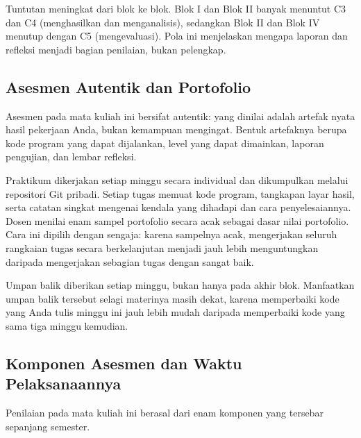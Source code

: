 Tuntutan meningkat dari blok ke blok. Blok I dan Blok II
banyak menuntut C3 dan C4 (menghasilkan dan menganalisis), sedangkan Blok II
dan Blok IV menutup dengan C5 (mengevaluasi). Pola ini menjelaskan mengapa
laporan  dan refleksi menjadi bagian penilaian, bukan
pelengkap.

\subsection{Asesmen Autentik dan Portofolio}

Asesmen pada mata kuliah ini bersifat autentik: yang dinilai adalah artefak
nyata hasil pekerjaan Anda, bukan kemampuan mengingat. Bentuk artefaknya
berupa kode program yang dapat dijalankan, level yang dapat dimainkan,
laporan pengujian, dan lembar refleksi.

Praktikum dikerjakan setiap minggu secara individual dan dikumpulkan melalui
repositori Git pribadi. Setiap tugas memuat kode program, tangkapan layar
hasil, serta catatan singkat mengenai kendala yang dihadapi dan cara
penyelesaiannya. Dosen menilai enam sampel portofolio secara acak sebagai
dasar nilai portofolio. Cara ini dipilih dengan sengaja: karena sampelnya
acak, mengerjakan seluruh rangkaian tugas secara berkelanjutan menjadi jauh
lebih menguntungkan daripada mengerjakan sebagian tugas dengan sangat baik.

Umpan balik diberikan setiap minggu, bukan hanya pada akhir blok. Manfaatkan
umpan balik tersebut selagi materinya masih dekat, karena memperbaiki kode
yang Anda tulis minggu ini jauh lebih mudah daripada memperbaiki kode yang
sama tiga minggu kemudian.

\subsection{Komponen Asesmen dan Waktu Pelaksanaannya}

Penilaian pada mata kuliah ini berasal dari enam komponen yang tersebar
sepanjang semester.

